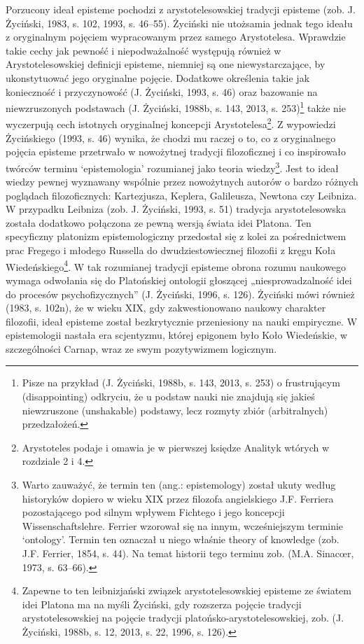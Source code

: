 \documentclass{article}
\begin{document}
Porzucony ideał episteme pochodzi z arystotelesowskiej tradycji episteme \label{ref:RNDRmhyRD3ZvW}(zob. J. Życiński,
1983, s. 102, 1993, s. 46–55). Życiński nie utożsamia jednak tego ideału z oryginalnym pojęciem wypracowanym przez
samego Arystotelesa. Wprawdzie takie cechy jak pewność i niepodważalność występują również w Arystotelesowskiej
definicji episteme, niemniej są one niewystarczające, by ukonstytuować jego oryginalne pojęcie. Dodatkowe określenia
takie jak konieczność i przyczynowość \label{ref:RNDUffssKrdla}(J. Życiński, 1993, s. 46) oraz bazowanie na
niewzruszonych podstawach \label{ref:RNDxd5cHMOpD0}(J. Życiński, 1988b, s. 143, 2013, s. 253)\footnote{Pisze na
przykład \label{ref:RNDydmrxn78a6}(J. Życiński, 1988b, s. 143, 2013, s. 253) o frustrującym (disappointing) odkryciu,
że u podstaw nauki nie znajdują się jakieś niewzruszone (unshakable) podstawy, lecz rozmyty zbiór (arbitralnych)
przedzałożeń.} także nie wyczerpują cech istotnych oryginalnej koncepcji Arystotelesa\footnote{Arystoteles podaje i
omawia je w pierwszej księdze Analityk wtórych w rozdziale 2 i 4.}. Z wypowiedzi Życińskiego
\label{ref:RNDawumYBBRbe}(1993, s. 46) wynika, że chodzi mu raczej o to, co z oryginalnego pojęcia episteme przetrwało
w nowożytnej tradycji filozoficznej i co inspirowało twórców terminu ‘epistemologia’ rozumianej jako teoria
wiedzy\footnote{Warto zauważyć, że termin ten (ang.: epistemology) został ukuty według historyków dopiero w wieku XIX
przez filozofa angielskiego J.F. Ferriera pozostającego pod silnym wpływem Fichtego i jego koncepcji
Wissenschaftslehre. Ferrier wzorował się na innym, wcześniejszym terminie ‘ontology’. Termin ten oznaczał u niego
właśnie theory of knowledge \label{ref:RNDLNW5r1yicU}(zob. J.F. Ferrier, 1854, s. 44). Na temat historii tego terminu
zob. \label{ref:RNDfrxMechpbI}(M.A. Sinacœr, 1973, s. 63–66).}. Jest to ideał wiedzy pewnej wyznawany wspólnie przez
nowożytnych autorów o bardzo różnych poglądach filozoficznych: Kartezjusza, Keplera, Galileusza, Newtona czy Leibniza.
W przypadku Leibniza \label{ref:RNDgl3cIrrlVL}(zob. J. Życiński, 1993, s. 51) tradycja arystotelesowska została
dodatkowo połączona ze pewną wersją świata idei Platona. Ten specyficzny platonizm epistemologiczny przedostał się z
kolei za pośrednictwem prac Fregego i młodego Russella do dwudziestowiecznej filozofii z kręgu Koła
Wiedeńskiego\footnote{Zapewne to ten leibnizjański związek arystotelesowskiej episteme ze światem idei Platona ma na
myśli Życiński, gdy rozszerza pojęcie tradycji arystotelesowskiej na pojęcie tradycji platońsko-arystotelesowskiej,
zob. \label{ref:RND3PMPQPUS6i}(J. Życiński, 1988b, s. 12, 2013, s. 22, 1996, s. 126).}. W tak rozumianej tradycji
episteme obrona rozumu naukowego wymaga odwołania się do Platońskiej ontologii głoszącej „niesprowadzalność idei do
procesów psychofizycznych” \label{ref:RNDhHlzendpnr}(J. Życiński, 1996, s. 126). Życiński mówi również
\label{ref:RNDynpLuVGokl}(1983, s. 102n), że w wieku XIX, gdy zakwestionowano naukowy charakter filozofii, ideał
episteme został bezkrytycznie przeniesiony na nauki empiryczne. W epistemologii nastała era scjentyzmu, której epigonem
było Koło Wiedeńskie, w szczególności Carnap, wraz ze swym pozytywizmem logicznym.
\end{document}
